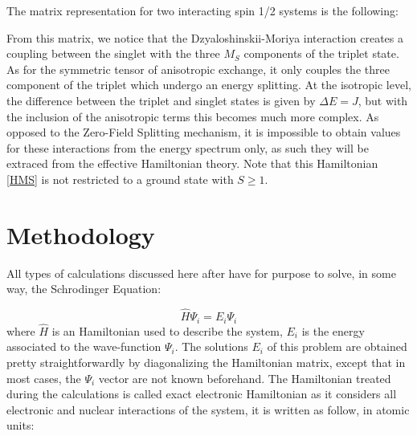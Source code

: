 \documentclass[12pt]{report}
\numberwithin{equation}{section}
\begin{document}
The matrix representation for two interacting spin 1/2 systems is the following:
\begin{center}
    \centering
\end{center}
From this matrix, we notice that the Dzyaloshinskii-Moriya interaction creates a coupling between the singlet with the three $M_S$ components of the triplet state.
As for the symmetric tensor of anisotropic exchange, it only couples the three component of the triplet which undergo an energy splitting.
At the isotropic level, the difference between the triplet and singlet states is given by $\Delta E=J$, but with the inclusion of the anisotropic terms this becomes much more complex. 
As opposed to the Zero-Field Splitting mechanism, it is impossible to obtain values for these interactions from the energy spectrum only, as such they will be extraced from the effective Hamiltonian theory.
Note that this Hamiltonian \ref{HMS} is not restricted to a ground state with $S\ge1$.

\section{Methodology}

All types of calculations discussed here after have for purpose to solve, in some way, the Schrodinger Equation:

\begin{equation}
    \hat{H}\Psi_i=E_i\Psi_i
\end{equation}
where $\hat{H}$ is an Hamiltonian used to describe the system, $E_i$ is the energy associated to the wave-function $\Psi_i$. 
The solutions $E_i$ of this problem are obtained pretty straightforwardly by diagonalizing the Hamiltonian matrix, except that in most cases, the $\Psi_i$ vector are not known beforehand.
The Hamiltonian treated during the calculations is called exact electronic Hamiltonian as it considers all electronic and nuclear interactions of the system, it is written as follow, in atomic units:
\end{document}
